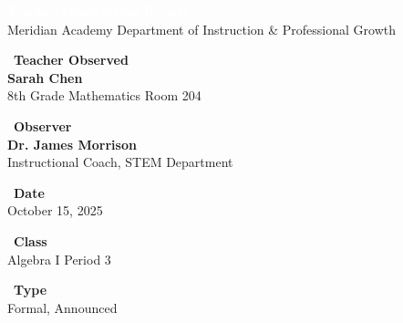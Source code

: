 \documentclass[11pt,a4paper]{article}
\begin{document}
\begin{tcolorbox}[colback=primary,colframe=primary,width=\textwidth,sharp corners,boxrule=0pt,left=18pt,right=18pt,top=14pt,bottom=14pt]
{\LARGE\textcolor{white}{\textbf{Teacher Observation Report}}}\\[4pt]
{\large\textcolor{white!80}{Meridian Academy {\textbullet} Department of Instruction \& Professional Growth}}
\end{tcolorbox}

\vspace{12pt}

\begin{minipage}[t]{0.48\textwidth}
\begin{tcolorbox}[infobox]
\noindent\textcolor{primary}{\faUser\ \textbf{Teacher Observed}}\\[2pt]
\textbf{Sarah Chen}\\[1pt]
{\small 8th Grade Mathematics {\textbullet} Room 204}
\end{tcolorbox}
\end{minipage}%
\hfill
\begin{minipage}[t]{0.48\textwidth}
\begin{tcolorbox}[infobox]
\noindent\textcolor{primary}{\faUser\ \textbf{Observer}}\\[2pt]
\textbf{Dr. James Morrison}\\[1pt]
{\small Instructional Coach, STEM Department}
\end{tcolorbox}
\end{minipage}

\vspace{10pt}

\begin{minipage}[t]{0.31\textwidth}
\begin{tcolorbox}[infobox]
\noindent\textcolor{primary}{\faCalendar\ \textbf{Date}}\\[2pt]
October 15, 2025
\end{tcolorbox}
\end{minipage}%
\hfill
\begin{minipage}[t]{0.31\textwidth}
\begin{tcolorbox}[infobox]
\noindent\textcolor{primary}{\faBook\ \textbf{Class}}\\[2pt]
Algebra I {\textbullet} Period 3
\end{tcolorbox}
\end{minipage}%
\hfill
\begin{minipage}[t]{0.31\textwidth}
\begin{tcolorbox}[infobox]
\noindent\textcolor{primary}{\faClipboardCheck\ \textbf{Type}}\\[2pt]
Formal, Announced
\end{tcolorbox}
\end{minipage}
\end{document}

